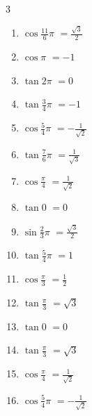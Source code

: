 \begin{multicols}{3}
\begin{enumerate}
  \item $\displaystyle \cos{\frac{11}{6}\pi}$
        $\displaystyle =\frac{\sqrt{3}}{2}$

  \item $\displaystyle \cos{\pi}$
        $\displaystyle =-1$

  \item $\displaystyle \tan{2\pi}$
        $\displaystyle =0$

  \item $\displaystyle \tan{\frac{3}{4}\pi}$
        $\displaystyle =-1$

  \item $\displaystyle \cos{\frac{5}{4}\pi}$
        $\displaystyle =-\frac{1}{\sqrt{2}}$

  \item $\displaystyle \tan{\frac{7}{6}\pi}$
        $\displaystyle =\frac{1}{\sqrt{3}}$

  \item $\displaystyle \cos{\frac{\pi}{4}}$
        $\displaystyle =\frac{1}{\sqrt{2}}$

  \item $\displaystyle \tan{0}$
        $\displaystyle =0$

  \item $\displaystyle \sin{\frac{2}{3}\pi}$
        $\displaystyle =\frac{\sqrt{3}}{2}$

  \item $\displaystyle \tan{\frac{5}{4}\pi}$
        $\displaystyle =1$

  \item $\displaystyle \cos{\frac{\pi}{3}}$
        $\displaystyle =\frac{1}{2}$

  \item $\displaystyle \tan{\frac{\pi}{3}}$
        $\displaystyle =\sqrt{3}$

  \item $\displaystyle \tan{0}$
        $\displaystyle =0$

\columnbreak %

  \item $\displaystyle \tan{\frac{\pi}{3}}$
        $\displaystyle =\sqrt{3}$

  \item $\displaystyle \cos{\frac{\pi}{4}}$
        $\displaystyle =\frac{1}{\sqrt{2}}$

  \item $\displaystyle \cos{\frac{5}{4}\pi}$
        $\displaystyle =-\frac{1}{\sqrt{2}}$


\end{enumerate}
\end{multicols}
